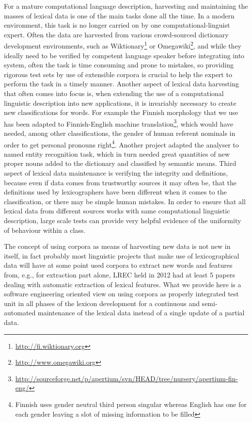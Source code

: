 \documentclass[a5paper]{article}
\begin{document}
For a mature computational language description, harvesting and maintaining the
masses of lexical data is one of the main tasks done all the time. In a modern
environment, this task is no longer carried on by one computational-linguist
expert. Often the data are harvested from various crowd-sourced dictionary
development environments, such as
Wiktionary\footnote{\url{http://fi.wiktionary.org}} or
O\-mega\-wi\-ki\footnote{\url{http://www.omegawiki.org}}, and while they
ideally need to be verified by competent language speaker before integrating
into system, often the task is time consuming and prone to mistakes, so
providing rigorous test sets by use of extensible corpora is crucial to help
the expert to perform the task in a timely manner. Another aspect of lexical
data harvesting that often comes into focus is, when extending the use of a
computational linguistic description into new applications, it is invariably
necessary to create new classifications for words. For example the Finnish
morphology that we use has been adapted to Finnish-English machine
translation\footnote{\url{http://sourceforge.net/p/apertium/svn/HEAD/tree/nursery/apertium-fin-eng/}},
which would have needed, among other classifications, the gender of human
referent nominals in order to get personal pronouns right\footnote{Finnish uses
gender neutral third person singular whereas English has one for each gender
leaving a slot of missing information to be filled}. Another project adapted
the analyser to named entity recognition task, which in turn needed great
quantities of new proper nouns added to the dictionary and classified by
semantic means. Third aspect of lexical data maintenance is verifying the
integrity and definitions, because even if data comes from trustworthy sources
it may often be, that the definitions used by lexicographers have been
different when it comes to the classification, or there may be simple human
mistakes. In order to ensure that all lexical data from different sources works
with same computational linguistic description, large scale tests can provide
very helpful evidence of the uniformity of behaviour within a class.

The concept of using corpora as means of harvesting new data is not new in
itself, in fact probably most linguistic projects that make use of
lexicographical data will have at some point used corpora to extract new words
and features from, e.g., for extraction part alone, LREC held in 2012 had at
least 5 papers dealing with automatic extraction of lexical features.  What we
provide here is a software engineering oriented view on using corpora as
properly integrated test unit in all phases of the lexicon development for a
continuous and semi-automated maintenance of the lexical data instead of a
single update of a partial data.
\end{document}
